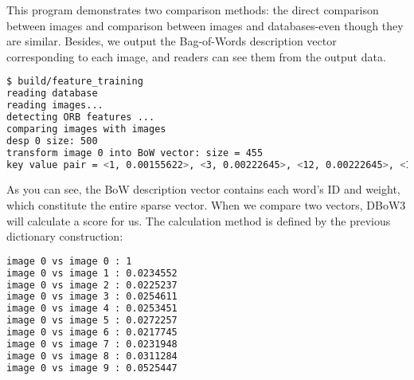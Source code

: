 This program demonstrates two comparison methods: the direct comparison between images and comparison between images and databases-even though they are similar. Besides, we output the Bag-of-Words description vector corresponding to each image, and readers can see them from the output data.

\begin{lstlisting}[language=sh,caption=Terminal output:]
$ build/feature_training
reading database
reading images... 
detecting ORB features ... 
comparing images with images 
desp 0 size: 500
transform image 0 into BoW vector: size = 455
key value pair = <1, 0.00155622>, <3, 0.00222645>, <12, 0.00222645>, <13, 0.00222645>, <14, 0.00222645>, <22, 0.00222645>, <33, 0.00222645>, <37, 0.00155622>, <38, 0.00222645>, <39, 0.00222645>, <43, 0.00222645>, <57, 0.00155622> ......
\end{lstlisting}

As you can see, the BoW description vector contains each word's ID and weight, which constitute the entire sparse vector. When we compare two vectors, DBoW3 will calculate a score for us. The calculation method is defined by the previous dictionary construction:

\begin{lstlisting}[language=sh,caption=Terminal output:]
image 0 vs image 0 : 1
image 0 vs image 1 : 0.0234552
image 0 vs image 2 : 0.0225237
image 0 vs image 3 : 0.0254611
image 0 vs image 4 : 0.0253451
image 0 vs image 5 : 0.0272257
image 0 vs image 6 : 0.0217745
image 0 vs image 7 : 0.0231948
image 0 vs image 8 : 0.0311284
image 0 vs image 9 : 0.0525447
\end{lstlisting}

